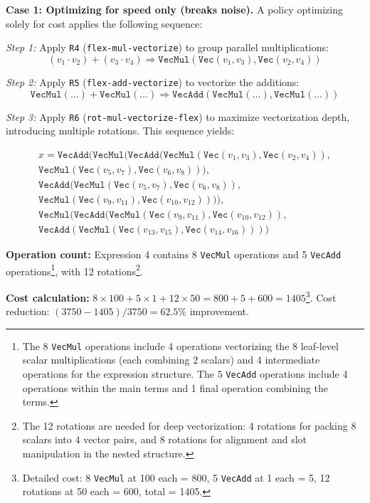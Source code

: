 \textbf{Case 1: Optimizing for speed only (breaks noise).} A policy optimizing solely for cost applies the following sequence:

\textit{Step 1:} Apply \texttt{R4} (\texttt{flex-mul-vectorize}) to group parallel multiplications:
\[
(v_1 \cdot v_2) + (v_3 \cdot v_4) \Rightarrow \texttt{VecMul}(\texttt{Vec}(v_1, v_3), \texttt{Vec}(v_2, v_4))
\]

\textit{Step 2:} Apply \texttt{R5} (\texttt{flex-add-vectorize}) to vectorize the additions:
\[
\texttt{VecMul}(\ldots) + \texttt{VecMul}(\ldots) \Rightarrow \texttt{VecAdd}(\texttt{VecMul}(\ldots), \texttt{VecMul}(\ldots))
\]

\textit{Step 3:} Apply \texttt{R6} (\texttt{rot-mul-vectorize-flex}) to maximize vectorization depth, introducing multiple rotations. This sequence yields:

{
\shrink[1.2]
\CodeSize
\begin{multline}
x = \texttt{VecAdd}(\texttt{VecMul}(\texttt{VecAdd}(\texttt{VecMul}(\texttt{Vec}(v_1, v_3), \texttt{Vec}(v_2, v_4)), \\
\texttt{VecMul}(\texttt{Vec}(v_5, v_7), \texttt{Vec}(v_6, v_8))), \\
\texttt{VecAdd}(\texttt{VecMul}(\texttt{Vec}(v_5, v_7), \texttt{Vec}(v_6, v_8)), \\
\texttt{VecMul}(\texttt{Vec}(v_9, v_{11}), \texttt{Vec}(v_{10}, v_{12})))), \\
\texttt{VecMul}(\texttt{VecAdd}(\texttt{VecMul}(\texttt{Vec}(v_9, v_{11}), \texttt{Vec}(v_{10}, v_{12})), \\
\texttt{VecAdd}(\texttt{VecMul}(\texttt{Vec}(v_{13}, v_{15}), \texttt{Vec}(v_{14}, v_{16}))))
\label{eq:case1-final}
\tag{4}
\end{multline}
\shrink[1.2]
}

\textbf{Operation count:} Expression 4 contains 8 \texttt{VecMul} operations and 5 \texttt{VecAdd} operations\footnote{The 8 \texttt{VecMul} operations include 4 operations vectorizing the 8 leaf-level scalar multiplications (each combining 2 scalars) and 4 intermediate operations for the expression structure. The 5 \texttt{VecAdd} operations include 4 operations within the main terms and 1 final operation combining the terms.}, with 12 rotations\footnote{The 12 rotations are needed for deep vectorization: 4 rotations for packing 8 scalars into 4 vector pairs, and 8 rotations for alignment and slot manipulation in the nested structure.}.

\textbf{Cost calculation:} $8 \times 100 + 5 \times 1 + 12 \times 50 = 800 + 5 + 600 = 1405$\footnote{Detailed cost: 8 \texttt{VecMul} at 100 each = 800, 5 \texttt{VecAdd} at 1 each = 5, 12 rotations at 50 each = 600, total = 1405.}. Cost reduction: $(3750 - 1405) / 3750 = 62.5\%$ improvement.

